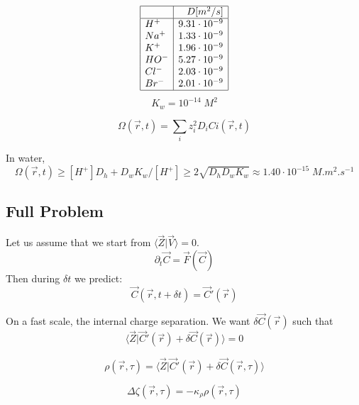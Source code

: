 \documentclass[aps,12pt]{revtex4}
\begin{document}
\begin{equation}
\begin{array}{|l|r|}
\hline
 \text{} & D[m^2/s]  \\
 \hline
 	H^+	 & 9.31\cdot10^{-9}	\\
 	Na^+ & 1.33\cdot10^{-9}	 \\
 	K^+	 & 1.96\cdot10^{-9}	 \\
 	HO^- & 5.27\cdot10^{-9}	 \\
 	Cl^- & 2.03\cdot10^{-9} \\
 	Br^- & 2.01\cdot10^{-9} \\
\hline
\end{array}
\end{equation}
$$
	K_w = 10^{-14}\; M^2
$$

\begin{equation}
	\Omega(\vec r,t) = \sum_i z_i^2 D_i Ci(\vec r, t)
\end{equation}

In water,
\begin{equation}
	\Omega(\vec r,t) \geq [H^+] D_h + D_w K_w/[H^+]  \geq 2 \sqrt{D_h D_w K_w} \approx 1.40 \cdot 10^{-15} \; M.m^2.s^{-1} 
\end{equation}

\subsection{Full Problem}

Let us assume that we start from $\langle \vec Z \vert \vec V \rangle = 0$.
\begin{equation}
	\partial_t \vec C = \vec F ( \vec C )
\end{equation}
Then during $\delta t$ we predict:
\begin{equation}
	\vec C (\vec r, t+\delta t) = \vec C ' (\vec r)
\end{equation}

On a fast scale, the internal charge separation.
We want $\delta \vec C(\vec r)$ such that
\begin{equation}
	\langle \vec Z \vert \vec C' (\vec r) + \delta \vec C(\vec r) \rangle = 0
\end{equation}

\begin{equation}
	\rho(\vec r,\tau) = \langle \vec Z \vert \vec C' (\vec r) + \delta \vec C(\vec r,\tau) \rangle
\end{equation}

\begin{equation}
	\Delta \zeta(\vec r, \tau) = - \kappa_\rho \rho(\vec r,\tau)
\end{equation}
\end{document}
